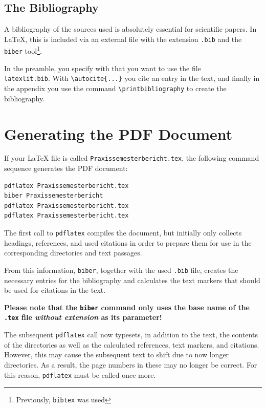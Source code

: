 \documentclass[pdftex,a4paper]{scrartcl}
\begin{document}


\subsection{The Bibliography}

A bibliography of the sources used is absolutely essential for scientific papers. In \LaTeX{}, this is included via an external file with the extension \verb+.bib+ and the \verb+biber+ tool\footnote{Previously, \texttt{bibtex} was used}.


In the preamble, you specify with \verb++ that you want to use the file \\\verb+latexlit.bib+. With \verb+\autocite{...}+ you cite an entry in the text, and finally in the appendix you use the command \verb+\printbibliography+ to create the bibliography.

\section{Generating the PDF Document}

If your \LaTeX{} file is called \verb+Praxissemesterbericht.tex+, the following command sequence generates the PDF document:

\begin{verbatim}
pdflatex Praxissemesterbericht.tex
biber Praxissemesterbericht
pdflatex Praxissemesterbericht.tex
pdflatex Praxissemesterbericht.tex
\end{verbatim}

The first call to \texttt{pdflatex} compiles the document, but initially only collects headings, references, and used citations in order to prepare them for use in the corresponding directories and text passages.

From this information, \texttt{biber}, together with the used \texttt{.bib} file, creates the necessary entries for the bibliography and calculates the text markers that should be used for citations in the text.

\textbf{Please note that the \texttt{biber} command only uses the base name of the \texttt{.tex} file \textit{without extension} as its parameter!}

The subsequent \texttt{pdflatex} call now typesets, in addition to the text, the contents of the directories as well as the calculated references, text markers, and citations. However, this may cause the subsequent text to shift due to now longer directories. As a result, the page numbers in these may no longer be correct. For this reason, \texttt{pdflatex} must be called once more.

\appendix
\printbibliography[heading=bibintoc]
\end{document}
